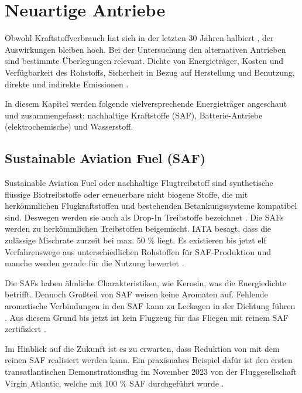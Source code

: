 
\section{Neuartige Antriebe}
\label{s:Neartige Antriebe}
Obwohl Kraftstoffverbrauch hat sich in der letzten 30 Jahren halbiert \cite{mensen2013handbuch}, der Auswirkungen bleiben hoch.
Bei der Untersuchung den alternativen Antrieben sind bestimmte Überlegungen relevant. Dichte von Energieträger, Kosten 
und Verfügbarkeit des Rohstoffs, Sicherheit in Bezug auf Herstellung und Benutzung, 
direkte und indirekte  Emissionen \cite{ansell2023review}.

In diesem Kapitel werden folgende vielversprechende Energieträger angeschaut und zusammengefasst: nachhaltige Kraftstoffe (SAF), 
Batterie-Antriebe (elektrochemische) und Wasserstoff.

\subsection{Sustainable Aviation Fuel (SAF)}

Sustainable Aviation Fuel oder nachhaltige Flugtreibstoff sind synthetische flüssige Biotreibstoffe oder erneuerbare nicht biogene Stoffe, %
die mit herkömmlichen Flugkraftstoffen und bestehenden Betankungssysteme kompatibel sind.
Deswegen werden sie auch als Drop-In Treibstoffe bezeichnet \cite{iata_saf_2024}. 
Die SAFs werden zu herkömmlichen Treibstoffen beigemischt. IATA besagt, dass die zulässige Mischrate 
zurzeit bei max. 50 \% liegt. Es existieren bis jetzt elf Verfahrenswege aus unterschiedlichen Rohstoffen für SAF-Produktion und
manche werden gerade für die Nutzung bewertet \cite{icao_saf_conversion_2024}.

Die SAFs haben ähnliche Charakteristiken, wie Kerosin, was die Energiedichte betrifft. Dennoch Großteil von SAF weisen keine Aromaten auf. 
Fehlende aromatische Verbindungen in den SAF kann zu Leckagen in der Dichtung führen \cite{jarin2024emissions}. 
Aus diesem Grund bis jetzt ist kein Flugzeug für das Fliegen mit reinem SAF zertifiziert \cite{iata_saf_2024}.

Im Hinblick auf die Zukunft ist es zu erwarten, dass Reduktion von  mit dem reinen SAF realisiert werden kann.
Ein praxisnahes Beispiel dafür ist den ersten transatlantischen Demonstrationsflug im November 2023 von der Fluggesellschaft Virgin Atlantic,
welche mit 100 \% SAF durchgeführt wurde \cite{virginatlantic_saf_2023}. 

